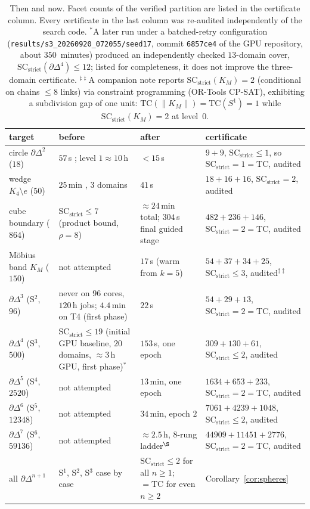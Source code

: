 \documentclass[12pt]{article}
\newcommand{\TC}{\mathrm{TC}}
\newcommand{\SC}{\mathrm{SC}}
\newcommand{\SCst}{\SC_{\mathrm{strict}}}
\begin{document}
\begin{table}[H]
\centering\footnotesize
\begin{tabular}{@{}>{\raggedright\arraybackslash}p{2.7cm}>{\raggedright\arraybackslash}p{3.5cm}>{\raggedright\arraybackslash}p{2.8cm}>{\raggedright\arraybackslash}p{4.2cm}@{}}
\toprule
target & before & after & certificate \\
\midrule
circle $\partial\Delta^2$ ($18$)
  & $57$\,s \cite{OLGB21}; level $1\approx10$\,h
  & $<15$\,s
  & $9+9$, $\SCst\le1$, so $\SCst=1=\TC$, audited\\
wedge $K_4\setminus e$ ($50$)
  & $25$\,min \cite{OLGB21}, $3$ domains
  & $41$\,s
  & $18+16+16$, $\SCst=2$, audited\\
cube boundary ($864$)
  & $\SCst\le 7$ (product bound, $\rho=8$)
  & $\approx 24$\,min total; $304$\,s final guided stage
  & $482+236+146$, $\SCst=2=\TC$, audited\\
M\"obius band $K_M$ ($150$)
  & not attempted
  & $17$\,s (warm from $k{=}5$)
  & $54+37+34+25$, $\SCst\le3$, audited$^{\ddagger\ddagger}$\\
$\partial\Delta^3$ (S$^2$, $96$)
  & never on $96$ cores, $120$\,h jobs;
    $4.4$\,min on T4 (first phase)
  & $22$\,s
  & $54+29+13$, $\SCst=2=\TC$, audited\\
$\partial\Delta^4$ (S$^3$, $500$)
  & $\SCst\le 19$ (initial GPU baseline, $20$ domains, $\approx3$\,h GPU, first phase)$^{*}$
  & $153$\,s, one epoch
  & $309+130+61$, $\SCst\le 2$, audited\\
$\partial\Delta^5$ (S$^4$, $2520$)
  & not attempted
  & $13$\,min, one epoch
  & $1634+653+233$, $\SCst=2=\TC$, audited\\
$\partial\Delta^6$ (S$^5$, $12348$)
  & not attempted
  & $34$\,min, epoch $2$
  & $7061+4239+1048$, $\SCst\le 2$, audited\\
$\partial\Delta^7$ (S$^6$, $59136$)
  & not attempted
  & ${\approx}2.5$\,h, $8$-rung ladder$^\S$
  & $44909+11451+2776$, $\SCst=2=\TC$, audited\\
all $\partial\Delta^{n+1}$
  & S$^1$, S$^2$, S$^3$ case by case
  & $\SCst\le2$ for all $n\ge1$; $=\TC$ for even $n\ge2$
  & Corollary~\ref{cor:spheres}\\
\bottomrule
\end{tabular}
\caption{Then and now.  Facet counts of the verified partition are listed
in the certificate column.  Every certificate in the last column was
re-audited independently of the search code.  $^{*}$A later run under a batched-retry configuration
(\texttt{results/s3\_20260920\_072055/seed17},
commit \texttt{6857ce4} of the GPU repository, about $350$~minutes)
produced an independently checked $13$-domain cover,
$\SCst(\partial\Delta^4)\le12$; listed for completeness, it does not
improve the three-domain certificate.
$^{\ddagger\ddagger}$A companion note \cite{PM26} reports
$\SCst(K_M)=2$ (conditional on chains $\le8$ links) via
constraint programming (OR-Tools CP-SAT), exhibiting a subdivision gap
of one unit: $\TC(\|K_M\|)=\TC(S^1)=1$ while $\SCst(K_M)=2$ at
level~$0$.}
\label{tab:records}
\end{table}
\end{document}

